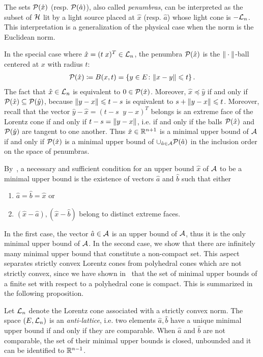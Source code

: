\documentclass[main]{subfiles}
\begin{document}
 The sets $\mathcal{P}(\hat x)$ (resp. $\mathcal{P}(\hat a)$), also called \emph{penumbras}, can be interpreted as the subset of $\mathcal{H}$ lit by a light source placed at $\hat x$ (resp. $\hat a$) whose light cone is $-\mathcal{L}_n$. This interpretation is a generalization of the physical case when the norm is the Euclidean norm.

In the special case where $\hat{x} = (t\;x)^T \in \mathcal{L}_n$, the penumbra $\mathcal{P}(\hat x)$ is the $\| \cdot \|$-ball centered at $x$ with radius $t$:
\begin{align*}
\mathcal{P}(\hat{x})  \coloneqq B(x,t) = \{ y \in E \colon \| x-y \| \leqslant t \} \,.
\end{align*}
The fact that $\hat{x} \in \mathcal{L}_n$ is equivalent to $0 \in \mathcal{P}(\hat{x})$. Moreover,  $\hat{x} \preceq \hat{y}$ if and only if $\mathcal{P}(\hat{x}) \subseteq \mathcal{P}(\hat{y})$, because $\| y-x \| \leqslant t-s$ is equivalent to $s + \| y-x \| \leqslant t$.
Moreover, recall that the vector $\hat y - \hat x = (t-s\;\; y-x)^T$ belongs is an extreme face of the Lorentz cone if and only if $t-s = \| y-x \|$, i.e. if and only if the balls $\mathcal{P}(\hat x)$ and $\mathcal{P}(\hat y)$ are tangent to one another.
Thus $\hat{x} \in \mathbb{R}^{n+1}$ is a minimal upper bound of $\mathcal{A}$ if and only if $\mathcal{P}(\hat x)$ is a minimal upper bound of $\cup_{\hat a \in \mathcal{A}} \mathcal{P}(\hat a)$ in the inclusion order on the space of penumbras.

By~, a necessary and sufficient condition for an upper bound $\hat x$ of $\mathcal{A}$ to be a minimal upper bound is the existence of vectors $\hat a$ and $\hat b$ such that either
\begin{enumerate}
\item $\hat a = \hat b = \hat x$ or
\item $(\hat x-\hat a), (\hat x-\hat b)$ belong to  distinct extreme faces.
\end{enumerate}

In the first case, the vector $\hat a \in \mathcal{A}$ is an upper bound of $\mathcal{A}$, thus it is the only minimal upper bound of $\mathcal{A}$.
In the second case, we show that there are infinitely many minimal upper bound that constitute a non-compact set. This aspect separates strictly convex Lorentz cones from polyhedral cones which are not strictly convex, since we have shown in~ that the set of minimal upper bounds of a finite set with respect to a polyhedral cone is compact. This is summarized in the following proposition.

\begin{proposition}
Let $\mathcal{L}_n$ denote the Lorentz cone associated with a strictly convex norm.
The space $(E, \mathcal{L}_n)$ is an \emph{anti-lattice}, i.e. two elements $\hat a, \hat b$ have a unique minimal upper bound if and only if they are comparable.
When $\hat a$ and $\hat b$ are not comparable, the set of their minimal upper bounds is closed, unbounded and it can be identified to $\mathbb{R}^{n-1}$.
\end{proposition}
\end{document}
